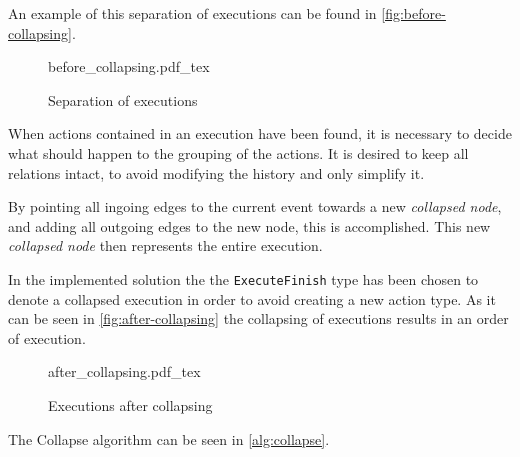 	An example of this separation of executions can be found in \autoref{fig:before-collapsing}.
	
	\begin{figure}
		\centering
		\def\svgwidth{0.42\columnwidth}
		\fontsize{6}{8}\selectfont
		{before_collapsing.pdf_tex}
		\caption{Separation of executions}
		\label{fig:before-collapsing}
	\end{figure}
	
	\newpar When actions contained in an execution have been found, it is necessary to decide what should happen to the grouping of the actions. It is desired to keep all relations intact, to avoid modifying the history and only simplify it. 
	
	By pointing all ingoing edges to the current event towards a new \textit{collapsed node}, and adding all outgoing edges to the new node, this is accomplished. This new \textit{collapsed node} then represents the entire execution. 
	
	In the implemented solution the the \texttt{ExecuteFinish} type has been chosen to denote a collapsed execution in order to avoid creating a new action type. As it can be seen in \autoref{fig:after-collapsing} the collapsing of executions results in an order of execution.
	
	\begin{figure}
		\centering
		\def\svgwidth{0.22\columnwidth}
		\fontsize{6}{8}\selectfont
		{after_collapsing.pdf_tex}
		\caption{Executions after collapsing}
		\label{fig:after-collapsing}
	\end{figure}
	
	The Collapse algorithm can be seen in \autoref{alg:collapse}.
	

